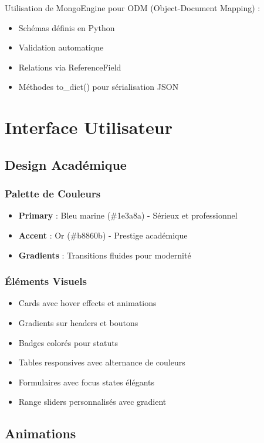 \documentclass[12pt,a4paper]{article}
\begin{document}
Utilisation de MongoEngine pour ODM (Object-Document Mapping) :
\begin{itemize}
    \item Schémas définis en Python
    \item Validation automatique
    \item Relations via ReferenceField
    \item Méthodes to\_dict() pour sérialisation JSON
\end{itemize}

\section{Interface Utilisateur}

\subsection{Design Académique}

\subsubsection{Palette de Couleurs}
\begin{itemize}
    \item \textbf{Primary} : Bleu marine (\#1e3a8a) - Sérieux et professionnel
    \item \textbf{Accent} : Or (\#b8860b) - Prestige académique
    \item \textbf{Gradients} : Transitions fluides pour modernité
\end{itemize}

\subsubsection{Éléments Visuels}
\begin{itemize}
    \item Cards avec hover effects et animations
    \item Gradients sur headers et boutons
    \item Badges colorés pour statuts
    \item Tables responsives avec alternance de couleurs
    \item Formulaires avec focus states élégants
    \item Range sliders personnalisés avec gradient
\end{itemize}

\subsection{Animations}
\end{document}
